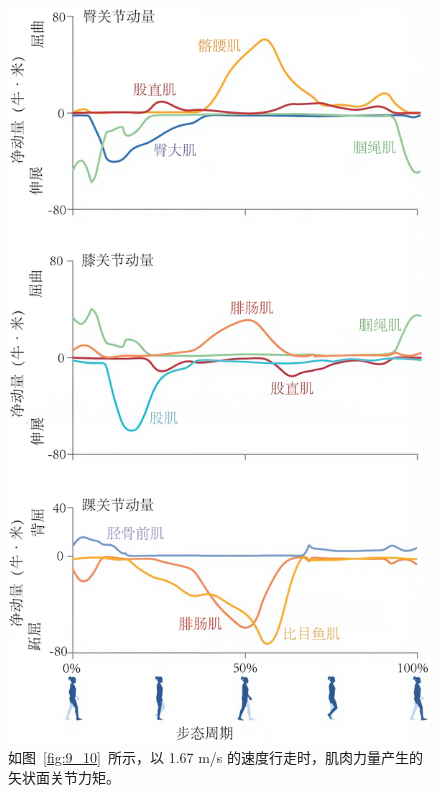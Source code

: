 \begin{figure}[!htb]
	\centering
	\includegraphics[width=0.8\linewidth]{chap9/9_11}
	\caption{如图~\ref{fig:9_10}~所示，以 1.67 m/s 的速度行走时，肌肉力量产生的矢状面关节力矩。 \label{fig:9_11}}
\end{figure}


